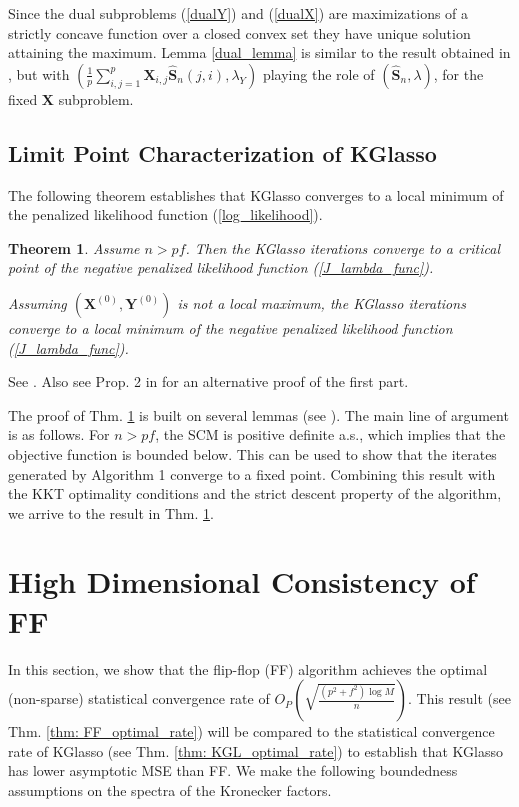 \documentclass[journal,11pt,draftcls,onecolumn]{IEEEtran}
\def\bS{ {\mathbf{S}} }
\def\bX{ {\mathbf{X}} }
\newtheorem{theorem}{Theorem}
\begin{document}
Since the dual subproblems (\ref{dualY}) and (\ref{dualX}) are maximizations of a strictly concave function over a closed convex set they have unique solution attaining the maximum.  Lemma \ref{dual_lemma} is similar to the result obtained in \cite{ModelSel}, but with $(\frac{1}{p}\sum_{i,j=1}^p{\bX_{i,j} \hat{\bS}_n(j,i)}, \lambda_Y)$ playing the role of $(\hat{\bS}_n,\lambda)$, for the fixed $\bX$ subproblem.


\subsection{Limit Point Characterization of KGlasso}
The following theorem establishes that KGlasso converges to a local minimum of the penalized likelihood function (\ref{log_likelihood}).

\begin{theorem} \label{convergence_theorem_critical}
Assume $n>pf$. Then the KGlasso iterations converge to a critical point of the negative penalized likelihood function (\ref{J_lambda_func}).

Assuming $(\mathbf{X}^{(0)},\mathbf{Y}^{(0)})$ is not a local maximum, the KGlasso iterations converge to a local minimum of the negative penalized likelihood function (\ref{J_lambda_func}).
\end{theorem}
\begin{IEEEproof}
	See \cite{TsiligkaridisTSP}. Also see Prop. 2 in \cite{AllenTib10} for an alternative proof of the first part.
\end{IEEEproof}

The proof of Thm. \ref{convergence_theorem_critical} is built on several lemmas (see \cite{TsiligkaridisTSP}). The main line of argument is as follows. For $n>pf$, the SCM is positive definite a.s., which implies that the objective function is bounded below. This can be used to show that the iterates generated by Algorithm 1 converge to a fixed point. Combining this result with the KKT optimality conditions and the strict descent property of the algorithm, we arrive to the result in Thm. \ref{convergence_theorem_critical}.


\section{High Dimensional Consistency of FF} \label{sec: FF_rate}
In this section, we show that the flip-flop (FF) algorithm achieves the optimal (non-sparse) statistical convergence rate of $O_P \left(\sqrt{\frac{(p^2+f^2)\log M}{n}}\right)$. This result (see Thm. \ref{thm: FF_optimal_rate}) will be compared to the statistical convergence rate of KGlasso (see Thm. \ref{thm: KGL_optimal_rate}) to establish that KGlasso has lower asymptotic MSE than FF. We make the following boundedness assumptions on the spectra of the Kronecker factors.
\end{document}
